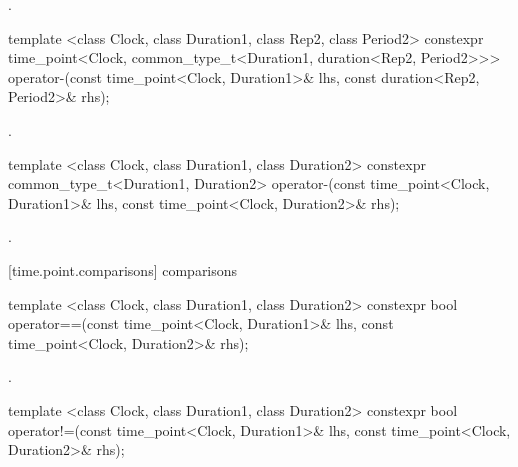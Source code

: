 \begin{itemdescr}
\pnum
\returns {}.
\end{itemdescr}

%
%
%
%
\begin{itemdecl}
template <class Clock, class Duration1, class Rep2, class Period2>
  constexpr time_point<Clock, common_type_t<Duration1, duration<Rep2, Period2>>>
  operator-(const time_point<Clock, Duration1>& lhs, const duration<Rep2, Period2>& rhs);
\end{itemdecl}

\begin{itemdescr}
\pnum
\returns {}.
\end{itemdescr}

%
%
\begin{itemdecl}
template <class Clock, class Duration1, class Duration2>
  constexpr common_type_t<Duration1, Duration2>
  operator-(const time_point<Clock, Duration1>& lhs, const time_point<Clock, Duration2>& rhs);
\end{itemdecl}

\begin{itemdescr}
\pnum
\returns {}.
\end{itemdescr}

[time.point.comparisons]{ comparisons}

%
%
\begin{itemdecl}
template <class Clock, class Duration1, class Duration2>
  constexpr bool operator==(const time_point<Clock, Duration1>& lhs, const time_point<Clock, Duration2>& rhs);
\end{itemdecl}

\begin{itemdescr}
\pnum
\returns {}.
\end{itemdescr}

%
%
\begin{itemdecl}
template <class Clock, class Duration1, class Duration2>
  constexpr bool operator!=(const time_point<Clock, Duration1>& lhs, const time_point<Clock, Duration2>& rhs);
\end{itemdecl}

